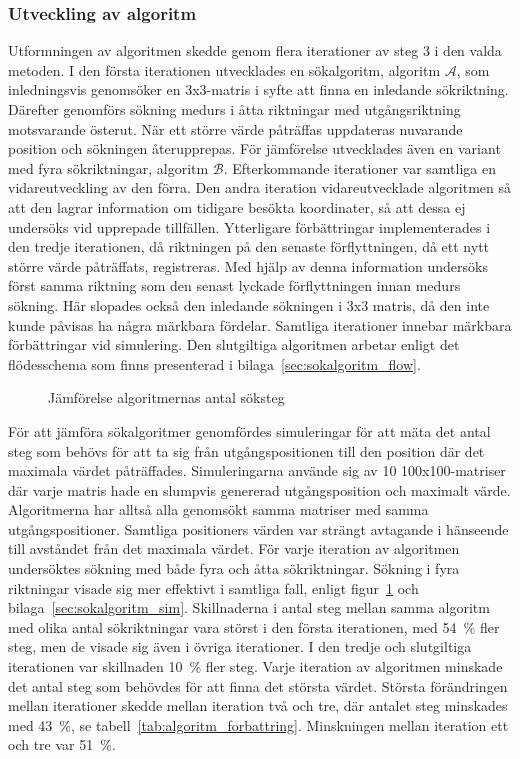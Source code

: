         \subsubsection{Utveckling av algoritm} %
        \label{ssub:utveckling_av_algoritm}
            Utformningen av algoritmen skedde genom flera iterationer av steg 3 i den valda metoden. I den första iterationen utvecklades en sökalgoritm, algoritm $\mathscr{A}$, som inledningsvis genomsöker en 3x3-matris i syfte att finna en inledande sökriktning. Därefter genomförs sökning medurs i åtta riktningar med utgångsriktning motsvarande österut. När ett större värde påträffas uppdateras nuvarande position och sökningen återupprepas. För jämförelse utvecklades även en variant med fyra sökriktningar, algoritm $\mathscr{B}$. Efterkommande iterationer var samtliga en vidareutveckling av den förra. Den andra iteration vidareutvecklade algoritmen så att den lagrar information om tidigare besökta koordinater, så att dessa ej undersöks vid upprepade tillfällen. Ytterligare förbättringar implementerades i den tredje iterationen, då riktningen på den senaste förflyttningen, då ett nytt större värde påträffats, registreras. Med hjälp av denna information undersöks först samma riktning som den senast lyckade förflyttningen innan medurs sökning. Här slopades också den inledande sökningen i 3x3 matris, då den inte kunde påvisas ha några märkbara fördelar. Samtliga iterationer innebar märkbara förbättringar vid simulering. Den slutgiltiga algoritmen arbetar enligt det flödesschema som finns presenterad i bilaga~\ref{sec:sokalgoritm_flow}.\bigskip

            \begin{figure}[b]
                
            \caption{\label{fig:algoritm_steg} Jämförelse algoritmernas antal söksteg}
            \end{figure} 

            För att jämföra sökalgoritmer genomfördes simuleringar för att mäta det antal steg som behövs för att ta sig från utgångspositionen till den position där det maximala värdet påträffades. Simuleringarna använde sig av 10 100x100-matriser där varje matris hade en slumpvis genererad utgångsposition och maximalt värde. Algoritmerna har alltså alla genomsökt samma matriser med samma utgångspositioner. Samtliga positioners värden var strängt avtagande i hänseende till avståndet från det maximala värdet. För varje iteration av algoritmen undersöktes sökning med både fyra och åtta sökriktningar. Sökning i fyra riktningar visade sig mer effektivt i samtliga fall, enligt figur~\ref{fig:algoritm_steg} och bilaga~\ref{sec:sokalgoritm_sim}. Skillnaderna i antal steg mellan samma algoritm med olika antal sökriktningar vara störst i den första iterationen, med 54~\% fler steg, men de visade sig även i övriga iterationer. I den tredje och slutgiltiga iterationen var skillnaden 10~\% fler steg. Varje iteration av algoritmen minskade det antal steg som behövdes för att finna det största värdet. Största förändringen mellan iterationer skedde mellan iteration två och tre, där antalet steg minskades med 43~\%, se tabell~\ref{tab:algoritm_forbattring}. Minskningen mellan iteration ett och tre var 51~\%. \bigskip


